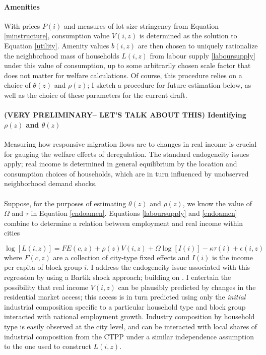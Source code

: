 \documentclass[]{article}
\begin{document}
\paragraph*{Amenities} With prices $P(i)$ and measures of lot size stringency from Equation \eqref{minstructure}, consumption value $V(i, z)$ is determined as the solution to Equation \eqref{utility}. Amenity values $b(i, z)$ are then chosen to uniquely rationalize the neighborhood mass of households $L(i, z)$ from labour supply \eqref{laboursupply} under this value of consumption, up to some arbitrarily chosen scale factor that does not matter for welfare calculations. Of course, this procedure relies on a choice of $\theta(z)$ and $\rho(z)$; I sketch a procedure for future estimation below, as well as the choice of these parameters for the current draft. 

\paragraph*{(VERY PRELIMINARY-- LET'S TALK ABOUT THIS) Identifying $\rho(z)$ and $\theta(z)$}
Measuring how responsive migration flows are to changes in real income is crucial for gauging the welfare effects of deregulation. The standard endogeneity issues apply; real income is determined in general equilibrium by the location and consumption choices of households, which are in turn influenced by unobserved neighborhood demand shocks.

\paragraph*{}
Suppose, for the purposes of estimating $\theta(z)$ and $\rho(z)$, we know the value of $\Omega$ and $\tau$ in Equation \eqref{endoamen}. Equations \eqref{laboursupply} and \eqref{endoamen} combine to determine a relation between employment and real income within cities

\begin{equation}
\log[L(i, z)] = FE(c, z) + \rho(z)V(i, z)	+ \Omega\log[I(i)] - \kappa \tau(i) + \epsilon(i, z)
\end{equation}
where $F(c, z)$ are a collection of city-type fixed effects and $I(i)$ is the income per capita of block group $i$. I address the endogeneity issue associated with this regression by using a Bartik shock approach; building on \cite{BSH}. I entertain the possibility that real income $V(i, z)$ can be plausibly predicted by changes in the residential market access; this access is in turn predicted using only the \textit{initial} industrial composition specific to a particular household type and block group interacted with national employment growth. Industry composition by household type is easily observed at the city level, and can be interacted with local shares of industrial composition from the CTPP under a similar independence assumption to the one used to construct $L(i, z)$. 
\end{document}
